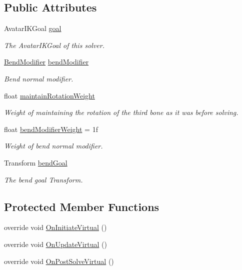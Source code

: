 \subsection*{Public Attributes}
\begin{DoxyCompactItemize}
\item 
Avatar\+I\+K\+Goal \mbox{\hyperlink{class_root_motion_1_1_final_i_k_1_1_i_k_solver_limb_af4266fb62c9f171f7e7c68a7bdbcdc44}{goal}}
\begin{DoxyCompactList}\small\item\em The Avatar\+I\+K\+Goal of this solver. \end{DoxyCompactList}\item 
\mbox{\hyperlink{class_root_motion_1_1_final_i_k_1_1_i_k_solver_limb_ae89bba0551841f9418b918ef8bff893c}{Bend\+Modifier}} \mbox{\hyperlink{class_root_motion_1_1_final_i_k_1_1_i_k_solver_limb_a8db1d3059608300fd358ff23d0aa70de}{bend\+Modifier}}
\begin{DoxyCompactList}\small\item\em Bend normal modifier. \end{DoxyCompactList}\item 
float \mbox{\hyperlink{class_root_motion_1_1_final_i_k_1_1_i_k_solver_limb_a484668b606095d02574459c2ee73142a}{maintain\+Rotation\+Weight}}
\begin{DoxyCompactList}\small\item\em Weight of maintaining the rotation of the third bone as it was before solving. \end{DoxyCompactList}\item 
float \mbox{\hyperlink{class_root_motion_1_1_final_i_k_1_1_i_k_solver_limb_a357c8dd58f1200257aaea5c2c015a684}{bend\+Modifier\+Weight}} = 1f
\begin{DoxyCompactList}\small\item\em Weight of bend normal modifier. \end{DoxyCompactList}\item 
Transform \mbox{\hyperlink{class_root_motion_1_1_final_i_k_1_1_i_k_solver_limb_a94c337fa04b1a6349e6788821acdb387}{bend\+Goal}}
\begin{DoxyCompactList}\small\item\em The bend goal Transform. \end{DoxyCompactList}\end{DoxyCompactItemize}
\subsection*{Protected Member Functions}
\begin{DoxyCompactItemize}
\item 
override void \mbox{\hyperlink{class_root_motion_1_1_final_i_k_1_1_i_k_solver_limb_ad7b356de1a54f7ce06b6c35faef32c69}{On\+Initiate\+Virtual}} ()
\item 
override void \mbox{\hyperlink{class_root_motion_1_1_final_i_k_1_1_i_k_solver_limb_af4aa8f2e26828c4a1d0426ea248ca40a}{On\+Update\+Virtual}} ()
\item 
override void \mbox{\hyperlink{class_root_motion_1_1_final_i_k_1_1_i_k_solver_limb_a8e2ae93521efeab2fe285de666b5b812}{On\+Post\+Solve\+Virtual}} ()
\end{DoxyCompactItemize}
